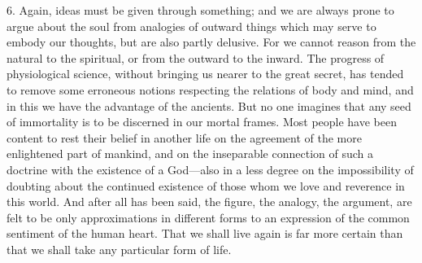 6. Again, ideas must be given through something; and we are always prone
to argue about the soul from analogies of outward things which may serve
to embody our thoughts, but are also partly delusive. For we cannot reason
from the natural to the spiritual, or from the outward to the inward. The
progress of physiological science, without bringing us nearer to the great
secret, has tended to remove some erroneous notions respecting the
relations of body and mind, and in this we have the advantage of the
ancients. But no one imagines that any seed of immortality is to be
discerned in our mortal frames. Most people have been content to rest
their belief in another life on the agreement of the more enlightened part
of mankind, and on the inseparable connection of such a doctrine with the
existence of a God—also in a less degree on the impossibility of
doubting about the continued existence of those whom we love and reverence
in this world. And after all has been said, the figure, the analogy, the
argument, are felt to be only approximations in different forms to an
expression of the common sentiment of the human heart. That we shall live
again is far more certain than that we shall take any particular form of
life.

